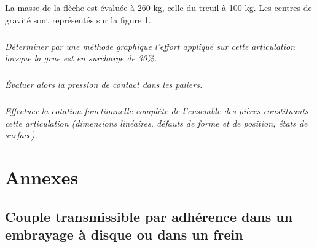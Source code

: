 \documentclass[10pt,fleqn]{article} %
\begin{document}
La masse de la flèche est évaluée à 260 kg, celle du treuil à 100 kg. Les centres de gravité sont représentés sur la figure 1. 

\subparagraph{}
\textit{Déterminer par une méthode graphique l'effort appliqué sur cette articulation lorsque la grue est en surcharge de 30\%.}

\subparagraph{}
\textit{Évaluer alors la pression de contact dans les paliers. }

\subparagraph{}
\textit{Effectuer la cotation fonctionnelle complète de l'ensemble des pièces constituants cette articulation (dimensions linéaires, défauts de forme et de position, états de surface).}


\section*{Annexes}

\subsection*{Couple transmissible par adhérence dans un embrayage à disque ou dans un frein}
\end{document}
